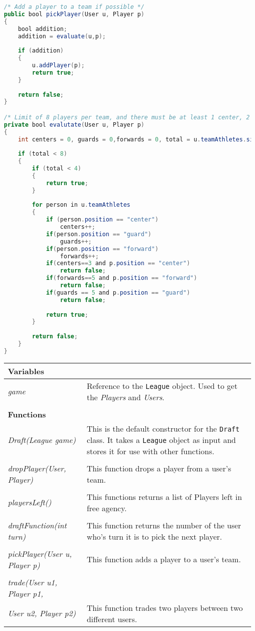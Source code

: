 \documentclass[12pt]{report}
\begin{document}
\begin{lstlisting}[language=Java,label=some-code,caption=Picking a Player]
/* Add a player to a team if possible */
public bool pickPlayer(User u, Player p)
{
	bool addition;
	addition = evaluate(u,p);
	
	if (addition)
	{
		u.addPlayer(p);
		return true;
	}
	
	return false;
}

/* Limit of 8 players per team, and there must be at least 1 center, 2 guards and 2 forwards per team. */
private bool evalutate(User u, Player p)
{
	int centers = 0, guards = 0,forwards = 0, total = u.teamAthletes.size();
	
	if (total < 8)
	{
		if (total < 4)
		{
			return true;
		}
		
		for person in u.teamAthletes
		{
			if (person.position == "center")
				centers++;
			if(person.position == "guard")
				guards++;
			if(person.position == "forward")
				forwards++;
			if(centers==3 and p.position == "center")
				return false;
			if(forwards==5 and p.position == "forward")
				return false;
			if(guards == 5 and p.position == "guard")
				return false;
				
			return true;
		}
		
		return false;
	}
}
\end{lstlisting}

\begin{flushleft}
\begin{onehalfspace}
\begin{tabular}[pos]{ l | p{10.5cm} }
\hline
\textbf{Variables} & \\
\hline
\textit{game} & Reference to the \texttt{League} object. Used to get the \textit{Players} and \textit{Users}. \\
\\
\hline
\textbf{Functions} & \\
\hline
\textit{Draft(League game)} & This is the default constructor for the \texttt{Draft} class. It takes a \texttt{League} object as input and stores it for use with other functions. \\
\\
\textit{dropPlayer(User, Player)} & This function drops a player from a user's team. \\
\\
\textit{playersLeft()} & This functions returns a list of Players left in free agency. \\
\\
\textit{draftFunction(int turn)} & This function returns the number of the user who's turn it is to pick the next player. \\
\\
\textit{pickPlayer(User u, Player p)} & This function adds a player to a user's team. \\
\\
\textit{trade(User u1, Player p1,} \\ \textit{User u2, Player p2)} & This function trades two players between two different users.
\\
\hline
\end{tabular}
\end{onehalfspace}
\end{flushleft}
\end{document}
